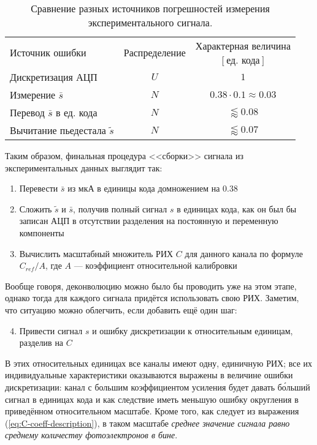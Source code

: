 \begin{table}
	\centering
	\begin{tabular}{ |l|c|c| }
		\toprule
		\multirow{2}{*}{Источник ошибки} & \multirow{2}{*}{Распределение}
		& Характерная величина \\
		& & $[\text{ед. кода}]$ \\
		\midrule
		Дискретизация АЦП & $U$ & $1$ \\ 
		Измерение $\bar{s}$ & $N$ & $0.38 \cdot 0.1 \approx 0.03$ \\ 
		Перевод $\bar{s}$ в ед. кода & $N$ & $\lessapprox 0.08$ \\ 
		Вычитание пьедестала $\tilde{s}$ & $N$ & $\lessapprox 0.07$ \\ 
		\bottomrule
	\end{tabular}
	\caption{\label{tab:s-measurement-errors}Сравнение разных источников погрешностей измерения экспериментального сигнала.}
\end{table}

Таким образом, финальная процедура <<сборки>> сигнала из экспериментальных данных выглядит так:

\begin{enumerate}
	\item Перевести $\bar{s}$ из мкА в единицы кода домножением на $0.38$
	\item Сложить $\tilde{s}$ и $\bar{s}$, получив полный сигнал $s$ в единицах кода, как он был бы записан АЦП в отсутствии разделения на постоянную и переменную компоненты
	\item Вычислить масштабный множитель РИХ $C$ для данного канала по формуле $C_{ref} / A$, где $A$ --- коэффициент относительной калибровки
\end{enumerate}

Вообще говоря, деконволюцию можно было бы проводить уже на этом этапе, однако тогда для каждого сигнала придётся использовать свою РИХ. Заметим, что ситуацию можно облегчить, если добавить ещё один шаг:

\begin{enumerate}
	\setcounter{enumi}{3}
	\item Привести сигнал $s$ и ошибку дискретизации к относительным единицам, разделив на $C$
\end{enumerate}

В этих относительных единицах все каналы имеют одну, единичную РИХ; все их индивидуальные характеристики оказываются выражены в величине ошибки дискретизации: канал с большим коэффициентом усиления будет давать б\'{о}льший сигнал в единицах кода и как следствие иметь меньшую ошибку округления в приведённом относительном масштабе. Кроме того, как следует из выражения (\ref{eq:C-coeff-description}), в таком масштабе \textit{среднее значение сигнала равно среднему количеству фотоэлектронов в бине}.

